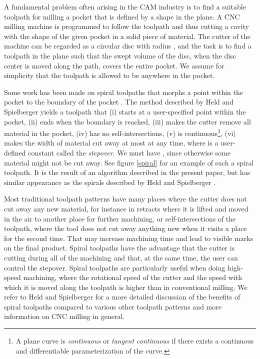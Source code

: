 \documentclass[3p]{elsarticle}
\newcommand{\comm}[1] {}
\begin{document}
A fundamental problem often arising in the CAM\comm{\footnote{Computer-aided manufacturing.}} industry
is to find a suitable toolpath for milling a pocket that is defined by a shape in the plane.
A CNC\comm{\footnote{Computer numerical control.}} milling machine is programmed to follow
the toolpath and thus cutting a cavity with the shape of the given pocket in a solid piece of material.
The cutter of the machine can be regarded as a circular disc with radius , and
the task is to find a toolpath in the plane
such that the swept volume of the disc, when the disc center is moved along the path,
covers the entire pocket. We assume for simplicity that the toolpath is allowed
to be anywhere in the pocket.

Some work has been made on spiral toolpaths that morphs a point
within the pocket to the boundary of the pocket \cite{bieterman2003, chuang2007, held2009, banerjee2012, held2014, huertas2014}.
The method described by Held and Spielberger
\cite{held2009} yields a toolpath that (i) starts at a user-specified
point within the pocket, (ii) ends when the boundary is reached, (iii) makes the cutter remove
all material in the pocket, (iv) has no self-intersections, (v)
is  continuous\footnote{A plane curve
is \emph{ continuous} or \emph{tangent continuous}
if there exists a continuous and differentiable parameterization of the curve.},
(vi) makes the width of material cut away at most  at any time, where
 is a user-defined constant called the \emph{stepover}.
We must have , since otherwise some material might not be cut away.
See figure \ref{spiral} for an example of such a spiral toolpath. It is the result of an algorithm
described in the present paper, but has similar appearance as the spirals described by Held and Spielberger
\cite{held2009}.

Most traditional toolpath patterns have many places where the cutter does not cut away any new
material, for instance in retracts where it is lifted and moved in the air to another place
for further machining, or self-intersections of the toolpath, where the tool
does not cut away anything new when it visits a place for the second time.
That may increase machining time and lead to visible marks on the
final product. Spiral toolpaths have the advantage that the cutter is
cutting during all of the machining and that, at the same time,
the user can control the stepover.
Spiral toolpaths are particularly useful when doing high-speed machining, where the
rotational speed of the cutter and the speed with which it is moved along the
toolpath is higher than in conventional milling.
We refer to Held and Spielberger \cite{held2009} for a more detailed discussion of
the benefits of spiral toolpaths compared to various other toolpath patterns
and more information on CNC milling in general.
\end{document}
